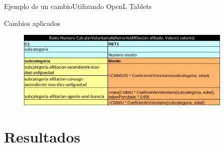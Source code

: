 \documentclass[10pt]{beamer}
\begin{document}
\begin{frame}{Ejemplo de un cambio}{Utilizando OpenL Tablets}
    \begin{block}{Cambios aplicados}
        \begin{figure}
            \centering
            \includegraphics[width=0.93\textwidth]{tables/voluntario_cambios.png}
        \end{figure}
    \end{block}
\end{frame}

\section{Resultados}
\end{document}

